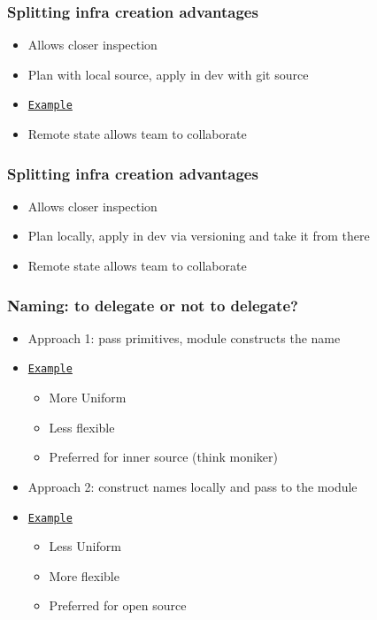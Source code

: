 \documentclass[9pt]{beamer}
\newcommand{\myblue} [1] {{\color{blue}#1}}
\begin{document}
\begin{frame}[fragile]
  \frametitle{Splitting infra creation advantages}

  \begin{itemize}[<+->]
    \item Allows closer inspection
    \item Plan with local source, apply in dev with git source
    \item \myblue{\href{https://github.com/saurabh-hirani/terraform-workshop/blob/master/assignment-8/dev/base/main.tf\#L2}{\texttt{Example}}}
    \item Remote state allows team to collaborate
  \end{itemize}

\end{frame}

\begin{frame}[fragile]
  \frametitle{Splitting infra creation advantages}

  \begin{itemize}[<+->]
    \item Allows closer inspection
    \item Plan locally, apply in dev via versioning and take it from there
    \item Remote state allows team to collaborate
  \end{itemize}

\end{frame}

\begin{frame}[fragile]
  \frametitle{Naming: to delegate or not to delegate?}
  \begin{itemize}[<+->]
    \item Approach 1: pass primitives, module constructs the name
    \item \myblue{\href{https://github.com/saurabh-hirani/terraform-workshop-module/blob/master/vpc/main.tf\#L1\#L11}{\texttt{Example}}}
      \begin{itemize}[<+->]
        \item More Uniform
        \item Less flexible
        \item Preferred for inner source (think moniker)
      \end{itemize}
    \item Approach 2: construct names locally and pass to the module
    \item \myblue{\href{https://github.com/saurabh-hirani/terraform-workshop-module/blob/master/vpc/main.tf\#L13\#L23}{\texttt{Example}}}
      \begin{itemize}[<+->]
        \item Less Uniform
        \item More flexible
        \item Preferred for open source
      \end{itemize}
  \end{itemize}
\end{frame}
\end{document}
